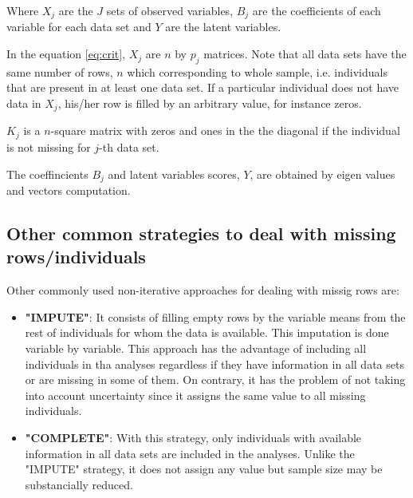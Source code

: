 \documentclass[article]{jss}
\begin{document}
Where $X_j$ are the $J$ sets of observed variables, $B_j$ are the coefficients of each variable for each data set and $Y$ are the latent variables.

In the equation \ref{eq:crit}, $X_j$ are $n$ by $p_j$ matrices. Note that all data sets have the same number of rows, $n$ which corresponding to whole sample, i.e. individuals that are present in at least one data set. If a particular individual does not have data in $X_j$, his/her row is filled by an arbitrary value, for instance zeros.

$K_j$ is a $n$-square matrix with zeros and ones in the the diagonal if the individual is not missing for $j$-th data set.

The coeffincients $B_j$ and latent variables scores, $Y$, are obtained by eigen values and vectors computation.


\subsection{Other common strategies to deal with missing rows/individuals} 

Other commonly used non-iterative approaches for dealing with missig rows are:

\begin{itemize}

\item \textbf{"IMPUTE"}: It consists of filling empty rows by the variable means from the rest of individuals for whom the data is available. This imputation is done variable by variable. This approach has the advantage of including all individuals in tha analyses regardless if they have information in all data sets or are missing in some of them. On contrary, it has the problem of not taking into account uncertainty since it assigns the same value to all missing individuals.

\item \textbf{"COMPLETE"}: With this strategy, only individuals with available information in all data sets are included in the analyses. Unlike the "IMPUTE" strategy, it does not assign any value but sample size may be substancially reduced.

\end{itemize}



\end{document}
